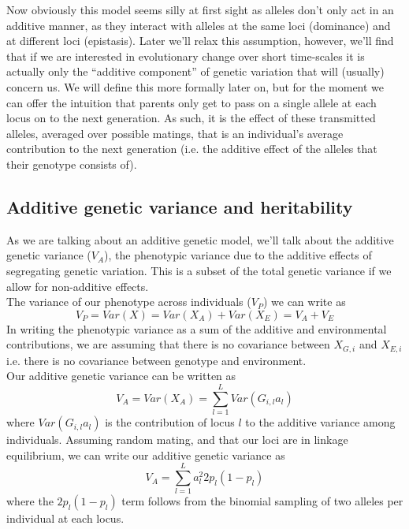 Now obviously this model seems silly at first sight as alleles don't only act in an additive manner, as they interact with alleles at the same loci (dominance) and at different loci (epistasis). Later we'll relax this assumption, 
however, we'll find that if we are interested in evolutionary change over short time-scales it is actually only the ``additive
component'' of genetic variation that will (usually) concern us. 
We will define this more formally later on, but for the moment 
we can offer the intuition that parents only get to pass on a single allele at each locus on to the next generation. As such, it is the effect of these transmitted alleles, averaged over possible matings, that is an individual's average contribution  to the next generation (i.e. the additive effect of the alleles that their genotype consists of).



\subsection{Additive genetic variance and heritability}
As we are talking about an additive genetic model, we'll talk about the additive genetic variance ($V_A$), the phenotypic variance due to the additive effects of segregating genetic variation. This is a subset of the total genetic
variance if we allow for non-additive effects. \\

The variance of our phenotype across individuals ($V_P$) we can write as
\begin{equation}
V_P = Var(X)= Var(X_A) + Var(X_E) = V_A+V_E
\end{equation}
In writing the phenotypic variance as a sum of the additive and
environmental contributions, we are assuming that there is no
covariance between $X_{G,i}$ and $X_{E,i}$ i.e. there is no covariance
between genotype and environment.  \\

Our additive genetic variance can be written as
\begin{equation}
V_A =Var(X_A)  =\sum_{l=1}^L Var(G_{i,l} a_{l})
\end{equation}
where $Var(G_{i,l} a_{l})$ is the contribution of locus $l$ to the additive
variance among individuals. Assuming random mating, and that our loci are in linkage equilibrium, we can write our additive genetic variance as
\begin{equation}
V_A = \sum_{l=1}^L a_{l}^2 2 p_l(1-p_l)  \label{eqn:VA}
\end{equation}
where the $ 2 p_l(1-p_l)$ term follows from the binomial sampling of
two alleles per individual at each locus. \\

